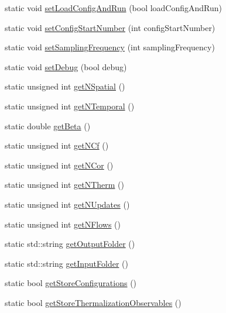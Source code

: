 \begin{DoxyCompactItemize}
\item 
static void \mbox{\hyperlink{class_parameters_aa7e911174ec1991f6750b9774b184fd3}{set\+Load\+Config\+And\+Run}} (bool load\+Config\+And\+Run)
\item 
static void \mbox{\hyperlink{class_parameters_a4863c437df48cd3242fdb67221a3d6ed}{set\+Config\+Start\+Number}} (int config\+Start\+Number)
\item 
static void \mbox{\hyperlink{class_parameters_ae9fa4bf77247404758c43179849ae3bf}{set\+Sampling\+Frequency}} (int sampling\+Frequency)
\item 
static void \mbox{\hyperlink{class_parameters_a6b0d9bf17b3c8096c3454d291e086ac2}{set\+Debug}} (bool debug)
\item 
static unsigned int \mbox{\hyperlink{class_parameters_a52b90e94a378ec9fe8c504cf546e98fa}{get\+N\+Spatial}} ()
\item 
static unsigned int \mbox{\hyperlink{class_parameters_a237ea1286459e8c648e983464829fe8d}{get\+N\+Temporal}} ()
\item 
static double \mbox{\hyperlink{class_parameters_ae5c64523dc50dca13b417fe3d9e4175c}{get\+Beta}} ()
\item 
static unsigned int \mbox{\hyperlink{class_parameters_a03f8c0aa2a31b9bfc016441cb263082c}{get\+N\+Cf}} ()
\item 
static unsigned int \mbox{\hyperlink{class_parameters_a0fd902d5efcd8dce17dbc3ea4177820d}{get\+N\+Cor}} ()
\item 
static unsigned int \mbox{\hyperlink{class_parameters_ad1f56cc1bb6c19f40454b30a5bc82da6}{get\+N\+Therm}} ()
\item 
static unsigned int \mbox{\hyperlink{class_parameters_ac10d294b56c295bdc7e8ea4fdccb917e}{get\+N\+Updates}} ()
\item 
static unsigned int \mbox{\hyperlink{class_parameters_aae314edb18d426571ab7b6df60da70aa}{get\+N\+Flows}} ()
\item 
static std\+::string \mbox{\hyperlink{class_parameters_afa4cfe5dc4302b1e8f8928606ea9b056}{get\+Output\+Folder}} ()
\item 
static std\+::string \mbox{\hyperlink{class_parameters_aa593520a8f1c3282e399feb0cf70217b}{get\+Input\+Folder}} ()
\item 
static bool \mbox{\hyperlink{class_parameters_a38f06b562355b56a1b1222e1cfe6735a}{get\+Store\+Configurations}} ()
\item 
static bool \mbox{\hyperlink{class_parameters_a216f85b3c5980a33f8a54c42fb3575c7}{get\+Store\+Thermalization\+Observables}} ()
\item 

\end{DoxyCompactItemize}
